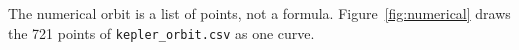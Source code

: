 The numerical orbit is a list of points, not a formula.
Figure~\ref{fig:numerical} draws the 721 points of \texttt{kepler\_orbit.csv}
as one curve.


